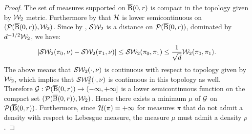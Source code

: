 \begin{proof}
The set of measures supported on $\operatorname{\overline{B}}(0,r)$ is compact in the topology given by ${\cal W}_2$ metric. Furthermore by \cite[Lemma 9.4.3]{ambrosio2008gradient}  that  ${\cal H}$ is lower semicontinuous on $({\cal P}(\operatorname{\overline{B}}(0,r)),{\cal W}_2)$. Since by \cite[Proposition 5.1.2, Proposition 5.1.3]{bonnotte2013unidimensional}, ${\cal S}{\cal W}_2$ is a distance  on ${\cal P}(\operatorname{\overline{B}}(0,r))$, dominated by $d^{-1/2} {\cal W}_2$, we have:
\[
|{\cal S}{\cal W}_2(\pi_0, \nu) - {\cal S}{\cal W}_2(\pi_1, \nu)| \leq {\cal S}{\cal W}_2(\pi_0, \pi_1) \leq \frac{1}{\sqrt{d}}{\cal W}_2(\pi_0, \pi_1).
\]
The above means that ${\cal S}{\cal W}_2(\cdot, \nu)$ is continuous with respect to topology given by ${\cal W}_2$, which implies that ${\cal S}{\cal W}_2^2(\cdot, \nu)$ is continuous in this topology as well. Therefore $\mathcal{G} : {\cal P}(\operatorname{\overline{B}}(0,r)) \to \left(-\infty,+\infty\right]$ is a lower semicontinuous function on the compact set $({\cal P}(\operatorname{\overline{B}}(0,r)),{\cal W}_2)$. Hence there exists a minimum  $\mu$ of $\mathcal{G}$ on $\mathcal{P}(\operatorname{\overline{B}}(0,r))$. Furthermore, since $\mathcal{H}(\pi) = +\infty$  for measures $\pi$ that do not admit a density with respect to Lebesgue measure, the measure $\mu$ must admit a density $\rho$.


\end{proof}
